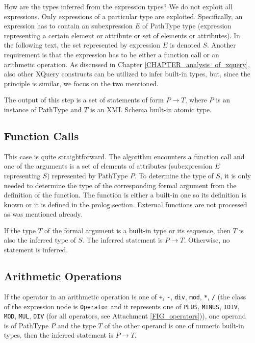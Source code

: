 How are the types inferred from the expression types? We do not exploit all expressions. Only expressions of a particular type are exploited. Specifically, an expression has to contain an subexpression $E$ of PathType type (expression representing a certain element or attribute or set of elements or attributes). In the following text, the set represented by expression $E$ is denoted $S$. Another requirement is that the expression has to be either a function call or an arithmetic operation. As discussed in Chapter \ref{CHAPTER_analysis_of_xquery}, also other XQuery constructs can be utilized to infer built-in types, but, since the principle is similar, we focus on the two mentioned.

The output of this step is a set of statements of form $P \rightarrow T$, where $P$ is an instance of PathType and $T$ is an XML Schema built-in atomic type.

\subsection{Function Calls}
This case is quite straightforward. The algorithm encounters a function call and one of the arguments is a set of elements of attributes (subexpression $E$ representing $S$) represented by PathType $P$. To determine the type of $S$, it is only needed to determine the type of the corresponding formal argument from the definition of the function. The function is either a built-in one so its definition is known or it is defined in the prolog section. External functions are not processed as was mentioned already.

If the type $T$ of the formal argument is a built-in type or its sequence, then $T$ is also the inferred type of $S$. The inferred statement is $P \rightarrow T$. Otherwise, no statement is inferred.

\subsection{Arithmetic Operations}
If the operator in an arithmetic operation is one of \texttt{+}, \texttt{-}, \texttt{div}, \texttt{mod}, \texttt{*}, \texttt{/} (the class of the expression node is \texttt{Operator} and it represents one of \texttt{PLUS}, \texttt{MINUS}, \texttt{IDIV}, \texttt{MOD}, \texttt{MUL}, \texttt{DIV} (for all operators, see Attachment \ref{FIG_operators})), one operand is of PathType $P$ and the type $T$ of the other operand is one of numeric built-in types, then the inferred statement is $P \rightarrow T$.

